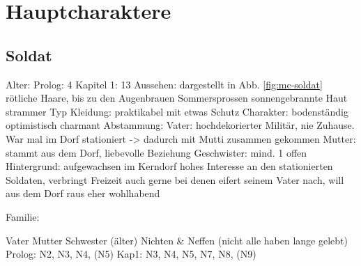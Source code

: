 \chapter{Hauptcharaktere}
\section{Soldat} \label{sec:mc-soldat}
\begin{outline}
	\1 Alter:
		\2 Prolog: 4
		\2 Kapitel 1: 13
	\1 Aussehen:
		\2 dargestellt in Abb. \ref{fig:mc-soldat}
		\2 rötliche Haare, bis zu den Augenbrauen
		\2 Sommersprossen
		\2 sonnengebrannte Haut
		\2 strammer Typ
	\1 Kleidung:
		\2 praktikabel
		\2 mit etwas Schutz
	\1 Charakter:
		\2 bodenständig 
		\2 optimistisch 
		\2 charmant 
	\1 Abstammung:
		\2 Vater: hochdekorierter Militär, nie Zuhause. War mal im Dorf stationiert -> dadurch mit Mutti zusammen gekommen
		\2 Mutter: stammt aus dem Dorf, liebevolle Beziehung
		\2 Geschwister: mind. 1 offen
	\1 Hintergrund:
		\2 aufgewachsen im Kerndorf
		\2 hohes Interesse an den stationierten Soldaten, verbringt Freizeit auch gerne bei denen
		\2 eifert seinem Vater nach, will aus dem Dorf raus
		\2 eher wohlhabend
\end{outline}

Familie:
\begin{outline}
	\1 Vater
	\1 Mutter
		 Schwester (älter)
			 Nichten \& Neffen (nicht alle haben lange gelebt)
			\3 Prolog: N2, N3, N4, (N5)
			\3 Kap1: N3, N4, N5, N7, N8, (N9)
\end{outline}

